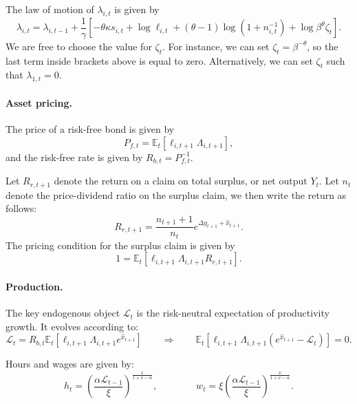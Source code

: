 The law of motion of $\lambda_{i,t}$ is given by
\begin{equation}
    \lambda_{i,t} = \lambda_{i,t-1}  + \frac{1}{\gamma}\left[ - \theta \kappa s_{i,t}+\log \ell_{i,t} + (\theta-1) \log (1+n_{i,t}^{-1}) + \log \beta^\theta \zeta_t\right].
\end{equation}
We are free to choose the value for $\zeta_t$. For instance, we can set $\zeta_t = \beta^{-\theta}$, so the last term inside brackets above is equal to zero. Alternatively, we can set $\zeta_t$ such that $\lambda_{1,t} = 0$. 

\paragraph{Asset pricing.} The price of a risk-free bond is given by
\begin{equation}
    P_{f,t} = \mathbb{E}_t\left[ \ell_{i,t+1} \Lambda_{i,t+1} \right],
\end{equation}
and the risk-free rate is given by $R_{b,t} = P_{f,t}^{-1}$. 

Let $R_{r,t+1} $ denote the return on a claim on total surplus, or net output $Y_t$. Let $n_{t}$ denote the price-dividend ratio on the surplus claim, we then write the return as follows:
\begin{equation}
    R_{r,t+1} = \frac{n_{t+1}+1}{n_t} e^{\Delta y_{t+1} + \hat{x}_{t+1}}. 
\end{equation}
The pricing condition for the surplus claim is given by
\begin{equation}
    1 = \mathbb{E}_t\left[ \ell_{i,t+1} \Lambda_{i,t+1} R_{r,t+1} \right].
\end{equation}


\paragraph{Production.} The key endogenous object \(\mathcal{L}_t\) is the risk-neutral expectation of productivity growth. It evolves according to:
\begin{equation}
    \mathcal{L}_t = R_{b,t} \mathbb{E}_t\left[ \ell_{i,t+1} \Lambda_{i,t+1} e^{\hat{x}_{t+1}} \right]
    \qquad \Rightarrow \qquad
    \mathbb{E}_t\left[ \ell_{i,t+1} \Lambda_{i,t+1} (e^{\hat{x}_{t+1}}- \mathcal{L}_t) \right] = 0.
\end{equation}

Hours and wages are given by:
\begin{equation}
    h_{t} = \left( \frac{\alpha \mathcal{L}_{t-1}}{\xi} \right)^{\frac{1}{1+\nu-\alpha}}, \qquad\qquad
    w_t = \xi \left( \frac{\alpha \mathcal{L}_{t-1}}{\xi} \right)^{\frac{\nu}{1+\nu-\alpha}}. 
\end{equation}

